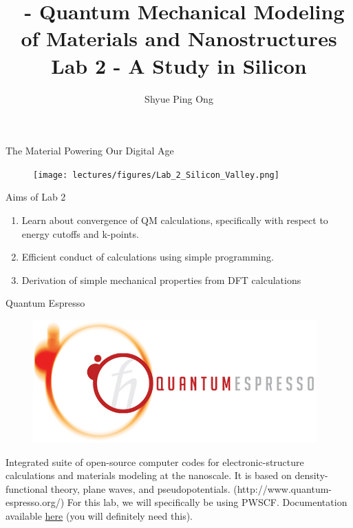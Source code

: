 \documentclass[aspectratio=169]{beamer}
\title[\classname Lab 2 - A Study in Silicon]{\classname~- Quantum Mechanical Modeling of Materials and Nanostructures\\Lab 2 - A Study in Silicon}
\author{Shyue Ping Ong}
\institute[UCSD]{University of California, San Diego\\
\medskip
}
\date{\classyear} %
\begin{document}
\begin{frame}
    \titlepage %
\end{frame}


\begin{frame}{The Material Powering Our Digital Age}
    \begin{figure}
        \centering
        \texttt{[image: lectures/figures/Lab\_2\_Silicon\_Valley.png]}
    \end{figure}
    
\end{frame}


\begin{frame}{Aims of Lab 2}
\Large{
\begin{enumerate}
    \item Learn about convergence of QM calculations, specifically with respect to energy cutoffs and k-points.
    \item Efficient conduct of calculations using simple programming.
    \item Derivation of simple mechanical properties from DFT calculations
\end{enumerate}
}
\end{frame}

\begin{frame}{Quantum Espresso}
\begin{figure}
    \centering
    \includegraphics[width=0.3\linewidth]{lectures/figures/Lab_2_Quantum_Espresso.png}
\end{figure} 
Integrated suite of open-source computer codes for electronic-structure calculations and materials modeling at the nanoscale. It is based on density-functional theory, plane waves, and pseudopotentials. (http://www.quantum-espresso.org/)\newline
\newline
For this lab, we will specifically be using PWSCF. Documentation available \href{https://www.quantum-espresso.org/Doc/pw_user_guide/}{here}
 (you will definitely need this).
\end{frame} 
\end{document}
